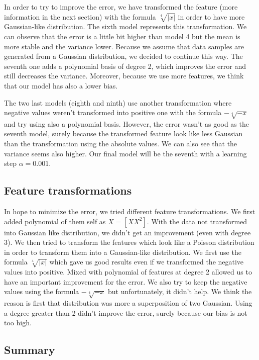 \documentclass{article} %
\begin{document}
In order to try to improve the error, we have transformed the feature (more information in the next section) with the formula $\sqrt[4]{|x|}$ in order to have more Gaussian-like distribution. The sixth model represents this transformation. We can observe that the error is a little bit higher than model 4 but the mean is more stable and the variance lower. Because we assume that data samples are generated from a Gaussian distribution, we decided to continue this way. The seventh one adds a polynomial basis of degree 2, which improves the error and still decreases the variance. Moreover, because we use more features, we think that our model has also a lower bias.

The two last models (eighth and ninth) use another transformation where negative values weren't transformed into positive one with the formula $-\sqrt[4]{-x}$ and try using also a polynomial basis. However, the error wasn't as good as the seventh model, surely because the transformed feature look like less Gaussian than the transformation using the absolute values. We can also see that the variance seems also higher.
Our final model will be the seventh with a learning step $\alpha=0.001$.

\subsection{Feature transformations}

In hope to minimize the error, we tried different feature transformations. We first added polynomial of them self as $X = [X X^2]$. With the data not transformed into Gaussian like distribution, we didn't get an improvement (even with degree 3). We then tried to transform the features which look like a Poisson distribution in order to transform them into a Gaussian-like distribution. We first use the formula $\sqrt[4]{|x|}$ which gave us good results even if we transformed the negative values into positive. Mixed with polynomial of features at degree 2 allowed us to have an important improvement for the error. We also try to keep the negative values using the formula $-\sqrt[4]{-x}$ but unfortunately, it didn't help. We think the reason is first that distribution was more a superposition of two Gaussian. Using a degree greater than 2 didn't improve the error, surely because our bias is not too high.

\subsection{Summary}
\end{document}
